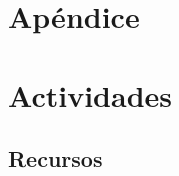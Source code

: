 \section{Apéndice}

\begin{frame}\justifying
\begin{center}
\Huge{\color{violet}{Apéndice}}
\end{center}
\normalsize{ }
\end{frame}

\section{Actividades}




\subsection{Recursos}



